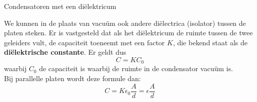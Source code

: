 \begin{theo}{Condensatoren met een diëlektricum}
    
    We kunnen in de plaats van vacuüm ook andere diëlectrica (isolator) tussen de platen steken. Er is vastgesteld dat als het diëlektricum de ruimte tussen de twee geleiders vult, de capaciteit toeneemt met een factor $K$, die bekend staat als de \textbf{diëlektrische constante}. Er geldt dus
    \begin{equation*}
        C = KC_0
    \end{equation*}
    waarbij $C_0$ de capaciteit is waarbij de ruimte in de condensator vacuüm is.\\

    \noindent Bij parallelle platen wordt deze formule dan:
    \begin{equation*}
        C = K\epsilon_0\dfrac{A}{d} = \epsilon\dfrac{A}{d}
    \end{equation*}
    \vspace{-0.5cm}
\end{theo}

\newpage

